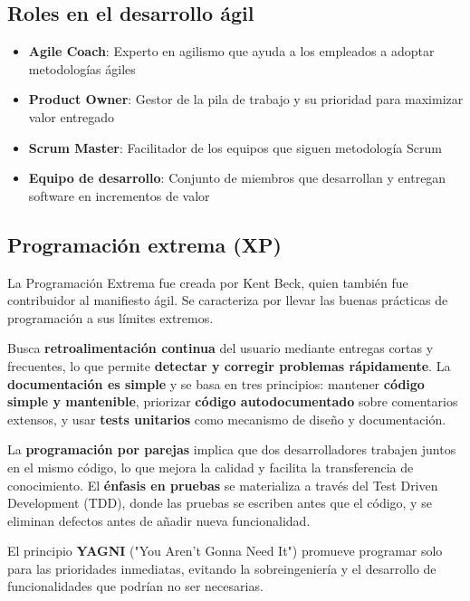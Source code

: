     \subsection{Roles en el desarrollo ágil}\label{subsec:roles-en-el-desarrollo-agil}

    \begin{itemize}
        \item \textbf{Agile Coach}: Experto en agilismo que ayuda a los empleados a adoptar metodologías ágiles
        \item \textbf{Product Owner}: Gestor de la pila de trabajo y su prioridad para maximizar valor entregado
        \item \textbf{Scrum Master}: Facilitador de los equipos que siguen metodología Scrum
        \item \textbf{Equipo de desarrollo}: Conjunto de miembros que desarrollan y entregan software en incrementos de valor
    \end{itemize}


    \subsection{Programación extrema (XP)}\label{subsec:programacion-extrema-(xp)}

    La Programación Extrema fue creada por Kent Beck, quien también fue contribuidor al manifiesto ágil.
    Se caracteriza por llevar las buenas prácticas de programación a sus límites extremos.

    Busca \textbf{retroalimentación continua} del usuario mediante entregas cortas y frecuentes, lo que permite \textbf{detectar y corregir problemas rápidamente}.
    La \textbf{documentación es simple} y se basa en tres principios: mantener \textbf{código simple y mantenible}, priorizar \textbf{código autodocumentado} sobre comentarios extensos, y usar\textbf{ tests unitarios }como mecanismo de diseño y documentación.

    La \textbf{programación por parejas} implica que dos desarrolladores trabajen juntos en el mismo código, lo que mejora la calidad y facilita la transferencia de conocimiento.
    El \textbf{énfasis en pruebas} se materializa a través del Test Driven Development (TDD), donde las pruebas se escriben antes que el código, y se eliminan defectos antes de añadir nueva funcionalidad.

    El principio \textbf{YAGNI} ("You Aren't Gonna Need It") promueve programar solo para las prioridades inmediatas, evitando la sobreingeniería y el desarrollo de funcionalidades que podrían no ser necesarias.


